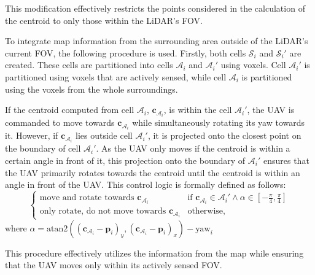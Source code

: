             This modification effectively restricts the points considered in the calculation of the centroid to only those within the \ac{LiDAR}'s \ac{FOV}.

            To integrate map information from the surrounding area outside of the \ac{LiDAR}'s current \ac{FOV}, the following procedure is used.
            Firstly, both cells $\mathcal{S}_i$ and $\mathcal{S}_i'$ are created. These cells are partitioned into cells $\mathcal{A}_i$ and $\mathcal{A}_i'$ using voxels. 
            Cell $\mathcal{A}_i'$ is partitioned using voxels that are actively sensed, while cell $\mathcal{A}_i$ is partitioned using the voxels from the whole surroundings.

            If the centroid computed from cell $\mathcal{A}_i$, $\mathbf{c}_{\mathcal{A}_i}$, is within the cell $\mathcal{A}_i'$, the \ac{UAV} is commanded to move towards $\mathbf{c}_{\mathcal{A}_i}$ while simultaneously rotating its yaw towards it.
            However, if $\mathbf{c}_{\mathcal{A}_i}$ lies outside cell $\mathcal{A}_i'$, it is projected onto the closest point on the boundary of cell $\mathcal{A}_i'$.
            As the \ac{UAV} only moves if the centroid is within a certain angle in front of it, this projection onto the boundary of $\mathcal{A}_i'$ ensures that the \ac{UAV} primarily rotates towards the centroid until the centroid is within an angle in front of the \ac{UAV}.
            This control logic is formally defined as follows:
            \begin{equation}
                \begin{cases}
                    \text{move and rotate towards } \mathbf{c}_{\mathcal{A}_i} & \text{if } \mathbf{c}_{\mathcal{A}_i} \in \mathcal{A}_i' \land \alpha \in [-\frac{\pi}{4}, \frac{\pi}{4}] \\
                    \text{only rotate, do not move towards } \mathbf{c}_{\mathcal{A}_i} & \text{otherwise, }
                \end{cases}
            \end{equation}
            where $\alpha = \text{atan2}((\mathbf{c}_{\mathcal{A}_i} - \mathbf{p}_i)_y, (\mathbf{c}_{\mathcal{A}_i} - \mathbf{p}_i)_x) - \text{yaw}_i$

            This procedure effectively utilizes the information from the map while ensuring that the \ac{UAV} moves only within its actively sensed \ac{FOV}.

